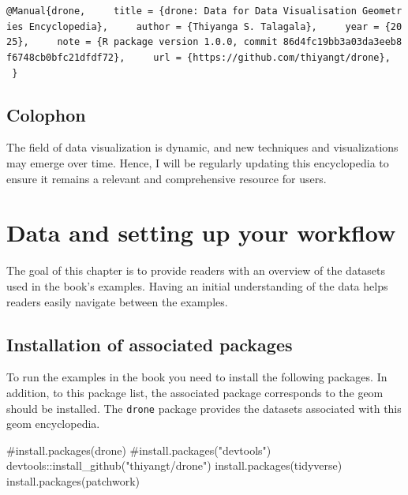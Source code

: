 \documentclass[
  letterpaper,
  DIV=11,
  numbers=noendperiod]{scrreprt}
\newenvironment{Shaded}{\begin{snugshade}}{\end{snugshade}}
\newcommand{\CommentTok}[1]{\textcolor[rgb]{0.37,0.37,0.37}{#1}}
\newcommand{\FunctionTok}[1]{\textcolor[rgb]{0.28,0.35,0.67}{#1}}
\newcommand{\NormalTok}[1]{\textcolor[rgb]{0.00,0.23,0.31}{#1}}
\newcommand{\SpecialCharTok}[1]{\textcolor[rgb]{0.37,0.37,0.37}{#1}}
\newcommand{\StringTok}[1]{\textcolor[rgb]{0.13,0.47,0.30}{#1}}
\begin{document}
\texttt{@Manual\{drone,\ \ \ \ \ title\ =\ \{drone:\ Data\ for\ Data\ Visualisation\ Geometries\ Encyclopedia\},\ \ \ \ \ author\ =\ \{Thiyanga\ S.\ Talagala\},\ \ \ \ \ year\ =\ \{2025\},\ \ \ \ \ note\ =\ \{R\ package\ version\ 1.0.0,\ commit\ 86d4fc19bb3a03da3eeb8f6748cb0bfc21dfdf72\},\ \ \ \ \ url\ =\ \{https://github.com/thiyangt/drone\},\ \ \ \}}

\section*{Colophon}\label{colophon}


The field of data visualization is dynamic, and new techniques and
visualizations may emerge over time. Hence, I will be regularly updating
this encyclopedia to ensure it remains a relevant and comprehensive
resource for users.


\chapter*{Data and setting up your
workflow}\label{data-and-setting-up-your-workflow}


The goal of this chapter is to provide readers with an overview of the
datasets used in the book's examples. Having an initial understanding of
the data helps readers easily navigate between the examples.

\section*{Installation of associated
packages}\label{installation-of-associated-packages}


To run the examples in the book you need to install the following
packages. In addition, to this package list, the associated package
corresponds to the geom should be installed. The \texttt{drone} package
provides the datasets associated with this geom encyclopedia.

\begin{Shaded}
\begin{Highlighting}[]
\CommentTok{\#install.packages(drone)}
\CommentTok{\#install.packages("devtools")}
\NormalTok{devtools}\SpecialCharTok{::}\FunctionTok{install\_github}\NormalTok{(}\StringTok{"thiyangt/drone"}\NormalTok{)}
\FunctionTok{install.packages}\NormalTok{(tidyverse)}
\FunctionTok{install.packages}\NormalTok{(patchwork)}
\end{Highlighting}
\end{Shaded}
\end{document}
